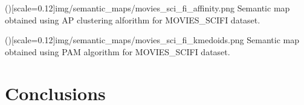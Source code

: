 \documentclass{ieeeaccess}
\begin{document}
\Figure[h]()[scale=0.12]{img/semantic_maps/movies_sci_fi_affinity.png}
{Semantic map obtained using AP clustering alforithm for MOVIES\_SCIFI dataset.\label{fig:semantic_map_movies_affinity}}

\Figure[h]()[scale=0.12]{img/semantic_maps/movies_sci_fi_kmedoids.png}
{Semantic map obtained using PAM algorithm for MOVIES\_SCIFI dataset.\label{fig:semantic_map_movies_affinity}}

\section{Conclusions}
\label{sec:conclusions}


\begin{comment}



\section{Methodology}
\label{sec:Method}


\subsection{Preliminaries}

A \textbf{graph} $G$, also known as network, is an abstract data type consisting
of a finite set of vertices (nodes) $V$, a finite set of links (edges) $E$ (disjoint
from $V$), and an \textit{incidence function} $\psi_{G}$ that associates with each
edge of $G$, an unordered pair of vertices of $G$. If $e \in E$ and $u, v \in V$ such that 
$\psi_{G}(e) =  uv$, then $e$ is said to join $u$ and $v$; the vertices $u$ and $v$ are
called the \textit{ends} of $e$ \cite{bondy1976graph}.

When a graph has attributes associated to nodes or edges, it can be
considered a knowledge graph. A \textbf{knowledge graph}
$KG=(E,R,T)$ consists of a set of entities $E$, a set of relations 
$R$, and a set of triples $T \subseteq E \times R \times E^{1}$. A
triple connecting entities $e_{i},e_{j} \in E$ with relation $r_{k} 
\in R$ is denoted $x_{ijk} = (e_{i},r_{k},e_{j})$ \cite{Koutra2019}. 
In other words, KGs consist in a collection of facts formed 
by $<subject,predicate,object>$. These collections are typically
represented in languages, such as RDF (Resource Description
Framework) \cite{RDF} and OWL (Ontology Web Language) \cite{OWL}.



\end{comment}
\end{document}

